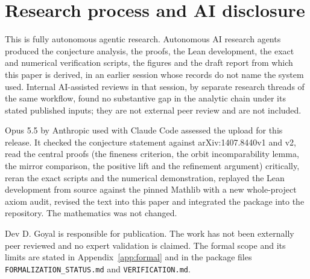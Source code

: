 \section{Research process and AI disclosure}

This is fully autonomous agentic research. Autonomous AI research agents produced the conjecture analysis, the proofs, the Lean development, the exact and numerical verification scripts, the figures and the draft report from which this paper is derived, in an earlier session whose records do not name the system used. Internal AI-assisted reviews in that session, by separate research threads of the same workflow, found no substantive gap in the analytic chain under its stated published inputs; they are not external peer review and are not included.

Opus 5.5 by Anthropic used with Claude Code assessed the upload for this release. It checked the conjecture statement against arXiv:1407.8440v1 and v2, read the central proofs (the fineness criterion, the orbit incomparability lemma, the mirror comparison, the positive lift and the refinement argument) critically, reran the exact scripts and the numerical demonstration, replayed the Lean development from source against the pinned Mathlib with a new whole-project axiom audit, revised the text into this paper and integrated the package into the repository. The mathematics was not changed.

Dev D. Goyal is responsible for publication. The work has not been externally peer reviewed and no expert validation is claimed. The formal scope and its limits are stated in Appendix~\ref{app:formal} and in the package files \texttt{FORMALIZATION\_STATUS.md} and \texttt{VERIFICATION.md}.
